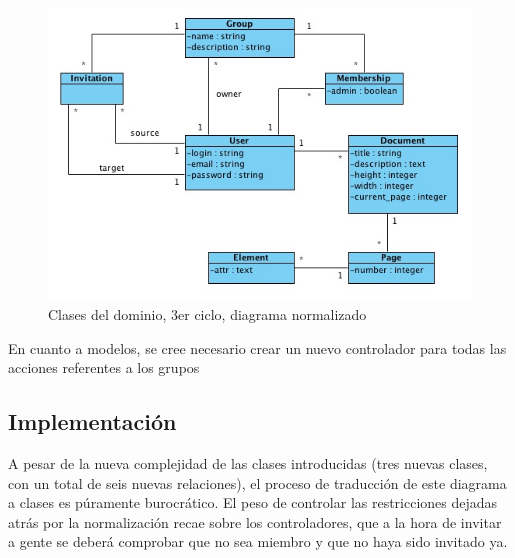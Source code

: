 \begin{figure}[h!]
\centering
\includegraphics[width=14cm]{uml3n.png}
\caption{Clases del dominio, 3er ciclo, diagrama normalizado}\label{fig:uml3n}
\end{figure}

En cuanto a modelos, se cree necesario crear un nuevo controlador para todas las acciones referentes a los grupos


\subsection{Implementación} %
\label{sub:implementación}

A pesar de la nueva complejidad de las clases introducidas (tres nuevas clases, con un total de seis nuevas relaciones), el proceso de traducción de este diagrama a clases es púramente burocrático. El peso de controlar las restricciones dejadas atrás por la normalización recae sobre los controladores, que a la hora de invitar a gente se deberá comprobar que no sea miembro y que no haya sido invitado ya.


